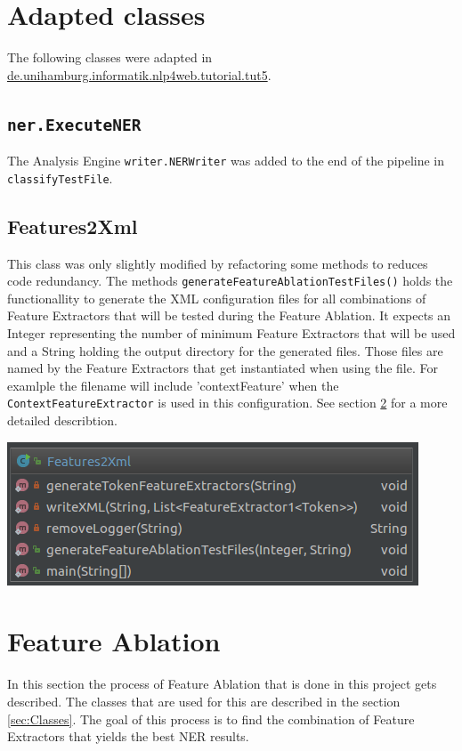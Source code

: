 \documentclass[11pt, english]{article}
\begin{document}
\section{Adapted classes}
The following classes were adapted in \url{de.unihamburg.informatik.nlp4web.tutorial.tut5}.

\subsection{\texttt{ner.ExecuteNER}}
The Analysis Engine \verb/writer.NERWriter/ was added to the end of the pipeline in \verb/classifyTestFile/.
\subsection{Features2Xml}
\label{sec:Features2Xml}
This class was only slightly modified by refactoring some methods to reduces code redundancy. The methods \verb/generateFeatureAblationTestFiles()/ holds the functionallity to generate the XML configuration files for all combinations of Feature Extractors that will be tested during the Feature Ablation. It expects an Integer representing the number of minimum Feature Extractors that will be used and a String holding the output directory for the generated files. Those files are named by the Feature Extractors that get instantiated when using the file. For examlple the filename will include 'contextFeature' when the \verb/ContextFeatureExtractor/ is used in this configuration. See section \ref{sec:Ablation} for a more detailed describtion.

\includegraphics[scale=0.5]{gfx/Features2Xml.png}
\label{fig:Features2Xml}


\section{Feature Ablation}
\label{sec:Ablation}
In this section the process of Feature Ablation that is done in this project gets described. The classes that are used for this are described in the section \ref{sec:Classes}. The goal of this process is to find the combination of Feature Extractors that yields the best NER results.
\end{document}

